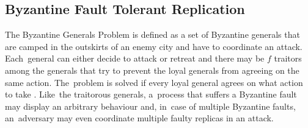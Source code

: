 \documentclass[algorithms,article,accept,moreauthors,pdftex,10pt,a4paper]{Definitions/mdpi}
\begin{document}
\subsection{Byzantine Fault Tolerant Replication} \label{Non-Crash}
The Byzantine Generals Problem is defined as a set of Byzantine generals that are camped in the outskirts of an enemy city and have to coordinate an attack. Each~general can either decide to attack or retreat and there may be $f$ traitors among the generals that try to prevent the loyal generals from agreeing on the same action. The~problem is solved if every loyal general agrees on what action to take \cite{LSP82}. Like~the traitorous generals, a~process that suffers a Byzantine fault may display an arbitrary behaviour and, in~case of multiple Byzantine faults, an~adversary may even coordinate multiple faulty replicas in an attack. \par
\end{document}
